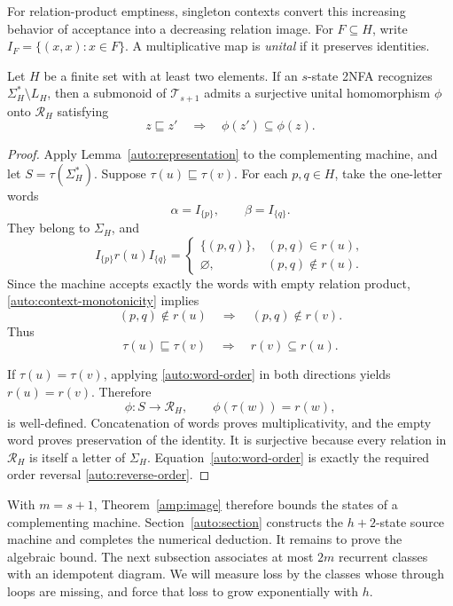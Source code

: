 For relation-product emptiness, singleton contexts convert this
increasing behavior of acceptance into a decreasing relation image.
For $F\subseteq H$, write $I_F=\{(x,x):x\in F\}$.
A multiplicative map is \emph{unital} if it preserves identities.

\begin{proposition}\label{auto:order-reversal}
Let $H$ be a finite set with at least two elements. If an $s$-state
2NFA recognizes $\Sigma_H^*\setminus L_H$, then a
submonoid of $\mathcal T_{s+1}$ admits a surjective unital
homomorphism $\phi$ onto $\mathcal R_H$ satisfying
\begin{equation}\label{auto:reverse-order}
  z\sqsubseteq z'
  \quad\Longrightarrow\quad
  \phi(z')\subseteq\phi(z).
\end{equation}
\end{proposition}
\begin{proof}
Apply Lemma~\ref{auto:representation} to the complementing machine,
and let $S=\tau(\Sigma_H^*)$.  Suppose
$\tau(u)\sqsubseteq\tau(v)$.  For each $p,q\in H$, take the
one-letter words
\[
  \alpha=I_{\{p\}},\qquad \beta=I_{\{q\}}.
\]
They belong to $\Sigma_H$, and
\[
 I_{\{p\}}r(u)I_{\{q\}}
 =
 \begin{cases}
   \{(p,q)\},& (p,q)\in r(u),\\
   \varnothing,&(p,q)\notin r(u).
 \end{cases}
\]
Since the machine accepts exactly the words with empty relation
product, \eqref{auto:context-monotonicity} implies
\[
  (p,q)\notin r(u)
  \quad\Longrightarrow\quad
  (p,q)\notin r(v).
\]
Thus
\begin{equation}\label{auto:word-order}
  \tau(u)\sqsubseteq\tau(v)
  \quad\Longrightarrow\quad
  r(v)\subseteq r(u).
\end{equation}

If $\tau(u)=\tau(v)$, applying \eqref{auto:word-order} in both
directions yields $r(u)=r(v)$.  Therefore
\[
  \phi:S\longrightarrow\mathcal R_H,
  \qquad \phi(\tau(w))=r(w),
\]
is well-defined.  Concatenation of words proves multiplicativity, and
the empty word proves preservation of the identity.  It is surjective
because every relation in $\mathcal R_H$ is itself a letter of
$\Sigma_H$.  Equation~\eqref{auto:word-order} is exactly the required
order reversal \eqref{auto:reverse-order}.
\end{proof}

With $m=s+1$, Theorem~\ref{amp:image} therefore bounds the states of a
complementing machine. Section~\ref{auto:section} constructs the
$h+2$-state source machine and completes the numerical deduction.
It remains to prove the algebraic bound. The next subsection associates
at most $2m$ recurrent classes with an idempotent diagram. We will measure
loss by the classes whose through loops are missing, and force that
loss to grow exponentially with $h$.


